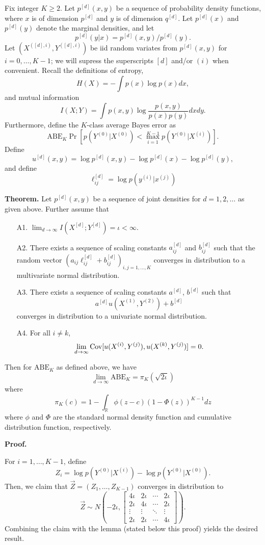 \documentclass[12pt]{article}
\begin{document}
Fix integer $K \geq 2$.  Let $p^{[d]}(x,y)$ be a sequence of
probability density functions, where $x$ is of dimension $p^{[d]}$ and
$y$ is of dimension $q^{[d]}$.  Let $p^{[d]}(x)$ and $p^{[d]}(y)$
denote the marginal densities, and let
\[
p^{[d]}(y|x) = p^{[d]}(x, y)/p^{[d]}(y).\]
 Let $(X^{([d], i)}, Y^{([d], i)})$ be
iid random variates from $p^{[d]}(x, y)$ for $i = 0, \hdots, K-1$; we will supress the
superscripts $[d]$ and/or $(i)$ when convenient.  Recall the definitions of
entropy,
\[
H(X) = -\int p(x) \log p(x) dx,
\]
and mutual information
\[
I(X; Y) = \int p(x, y) \log \frac{p(x, y)}{p(x)p(y)} dx dy.
\]
Furthermore, define the $K$-class average Bayes error as
\[
\text{ABE}_K \Pr[p(Y^{(0)}|X^{(0)}) < \max_{i = 1}^{K-1} p(Y^{(0)}|X^{(i)})].
\]
Define
\[
u^{[d]}(x, y) = \log p^{[d]}(x, y) - \log p^{[d]}(x) - \log p^{[d]}(y),
\]
and define
\[
\ell_{ij}^{[d]} = \log p(y^{(i)}|x^{(j)})
\]


\textbf{Theorem.} Let $p^{[d]}(x, y)$ be a sequence of joint densities
for $d = 1,2,\hdots$ as given above.  Further assume that
\begin{itemize}
\item[A1.] $\lim_{d \to \infty} I(X^{[d]}; Y^{[d]}) = \iota < \infty.$
\item[A2.] There exists a sequence of scaling constants $a_{ij}^{[d]}$
and $b_{ij}^{[d]}$ such that the random vector $(a_{ij}\ell_{ij}^{[d]} +
b_{ij}^{[d]})_{i, j = 1,\hdots, K}$ converges in distribution to a
multivariate normal distribution.
\item[A3.] There exists a sequence of scaling constants $a^{[d]}$, $b^{[d]}$ such that
\[
a^{[d]}u(X^{(1)}, Y^{(2)}) + b^{[d]}
\]
converges in distribution to a univariate normal distribution.
\item[A4.] For all $i \neq k$,
\[\lim_{d \to \infty}\text{Cov}[u(X^{(i)}, Y^{(j)}), u(X^{(k)}, Y^{(j)})] = 0.\]
\end{itemize}
Then for $\text{ABE}_K$ as defined above, we have
\[
\lim_{d \to \infty} \text{ABE}_{K} = \pi_K(\sqrt{2 \iota})
\]
where
\[
\pi_K(c) = 1 - \int_{\mathbb{R}} \phi(z - c) (1 - \Phi(z))^{K-1} dz
\]
where $\phi$ and $\Phi$ are the standard normal density function and
cumulative distribution function, respectively.

\textbf{Proof.}

For $i = 1,\hdots, K-1$, define
\[
Z_i = \log p(Y^{(0)}|X^{(i)}) - \log p(Y^{(0)}|X^{(0)}).
\]
Then, we claim that $\vec{Z} = (Z_1,\hdots, Z_{K-1})$ converges in distribution to
\[
\vec{Z} \sim N\left(-2\iota, 
\begin{bmatrix}
4\iota & 2\iota & \cdots & 2\iota\\
2\iota & 4\iota & \cdots & 2\iota\\
\vdots & \vdots & \ddots & \vdots\\
2\iota & 2\iota & \cdots & 4\iota
\end{bmatrix}
\right).
\]
Combining the claim with the lemma (stated below this proof) yields the
desired result.
\end{document}
